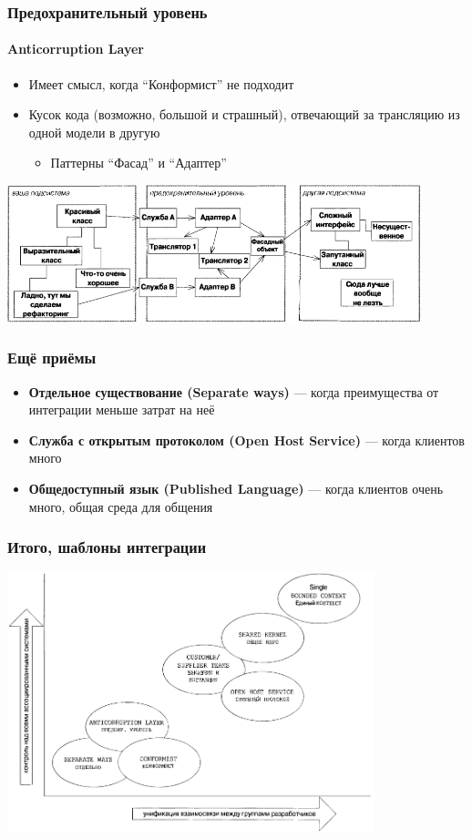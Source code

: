\documentclass[xetex,mathserif,serif]{beamer}
\begin{document}
	\begin{frame}
		\frametitle{Предохранительный уровень}
		\framesubtitle{Anticorruption Layer}
		\begin{itemize}
			\item Имеет смысл, когда ``Конформист'' не подходит
			\item Кусок кода (возможно, большой и страшный), отвечающий за трансляцию из одной модели в другую
			\begin{itemize}
				\item Паттерны ``Фасад'' и ``Адаптер'' 
			\end{itemize}
		\end{itemize}
		\begin{center}
			\includegraphics[width=0.9\textwidth]{anticorruptionLayer.png}
		\end{center}
	\end{frame}

	\begin{frame}
		\frametitle{Ещё приёмы}
		\begin{itemize}
			\item \textbf{Отдельное существование (Separate ways)} --- когда преимущества от интеграции меньше затрат на неё
			\item \textbf{Служба с открытым протоколом (Open Host Service)} --- когда клиентов много
			\item \textbf{Общедоступный язык (Published Language)} --- когда клиентов очень много, общая среда для общения
		\end{itemize}
	\end{frame}

	\begin{frame}
		\frametitle{Итого, шаблоны интеграции}
		\begin{center}
			\includegraphics[width=0.8\textwidth]{integrationPatterns.png}
		\end{center}
	\end{frame}
\end{document}
